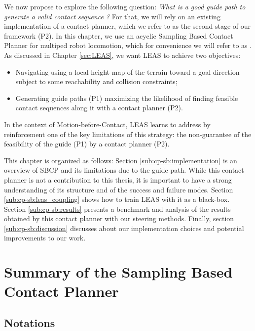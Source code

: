 We now propose to explore the following question: \textit{What is a \textit{good} guide path to generate a valid contact sequence ?}
For that, we will rely on an existing implementation of a contact planner, which we refer to as the second stage of our framework (P2). 
In this chapter, we use an acyclic Sampling Based Contact Planner \cite{AcyclicCP} for multiped robot locomotion, which for convenience we will refer to as .
As discussed in Chapter \ref{sec:LEAS}, we want LEAS to achieve two objectives:
\begin{itemize}
    \item Navigating using a local height map of the terrain toward a goal direction subject to some reachability and collision constraints;
    \item Generating guide paths (P1) maximizing the likelihood of finding feasible contact sequences along it with a contact planner (P2).
\end{itemize}
In the context of Motion-before-Contact, LEAS learns to address by reinforcement one of the key limitations of this strategy: the non-guarantee of the feasibility of the guide (P1) by a contact planner (P2).

This chapter is organized as follows:
Section \ref{sub:cp-sb:implementation} is an overview of SBCP and its limitations due to the guide path. While this contact planner is not a contribution to this thesis, it is important to have a strong understanding of its structure and of the success and failure modes.
Section \ref{sub:cp-sb:leas_coupling} shows how to train LEAS with it as a black-box. 
Section \ref{sub:cp-sb:results} presents a benchmark and analysis of the results obtained by this contact planner with our steering methods.
Finally, section \ref{sub:cp-sb:discussion} discusses about our implementation choices and potential improvements to our work.


\section{Summary of the Sampling Based Contact Planner \label{sub:cp-sb:implementation}}

\subsection{Notations}


